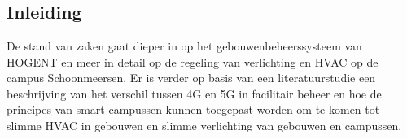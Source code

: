 \chapter{}%
\label{ch:stand-van-zaken}


\section{Inleiding}

De stand van zaken gaat dieper in op het gebouwenbeheerssysteem van HOGENT en meer in detail op de regeling van verlichting en HVAC op de campus Schoonmeersen. Er is verder op basis van een literatuurstudie een beschrijving van het verschil tussen 4G en 5G in facilitair beheer en hoe de principes van smart campussen kunnen toegepast worden om te komen tot slimme HVAC in gebouwen en slimme verlichting van gebouwen en campussen.
%
%
